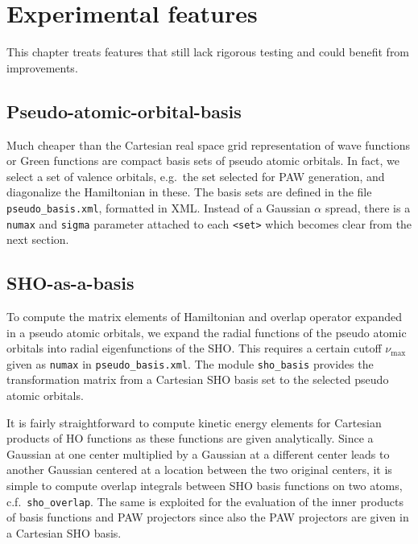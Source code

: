 \documentclass[oribibl]{llncs}
\newcommand{\um}[1]{_{\mathrm{#1}}}
\newcommand{\ttt}[1]{\texttt{#1}}
\begin{document}

\newpage
%

\section{Experimental features}
This chapter treats features that still lack rigorous testing and could benefit from improvements.

\subsection{Pseudo-atomic-orbital-basis}
Much cheaper than the Cartesian real space grid representation of wave functions or Green functions
are compact basis sets of pseudo atomic orbitals.
In fact, we select a set of valence orbitals, e.g.~the set selected for \ac{PAW} generation,
and diagonalize the Hamiltonian in these.
The basis sets are defined in the file \ttt{pseudo\_basis.xml}, formatted in \ac{XML}.
Instead of a Gaussian $\alpha$ spread, there is a \ttt{numax} and \ttt{sigma} parameter attached to each \ttt{<set>} which becomes clear from the next section.

\subsection{SHO-as-a-basis} \label{sec:sho-hamiltonian}
To compute the matrix elements of Hamiltonian and overlap operator expanded in a pseudo atomic orbitals,
we expand the radial functions of the pseudo atomic orbitals into radial eigenfunctions of the \ac{SHO}.
This requires a certain cutoff $\nu\um{max}$ given as \ttt{numax} in \ttt{pseudo\_basis.xml}.
The module \ttt{sho\_basis} provides the transformation matrix from a Cartesian \ac{SHO} basis set
to the selected pseudo atomic orbitals. 

It is fairly straightforward to compute kinetic energy elements for Cartesian products of \ac{HO} functions
as these functions are given analytically.
Since a Gaussian at one center multiplied by a Gaussian at a different center leads to another Gaussian
centered at a location between the two original centers, it is simple to compute overlap integrals between \ac{SHO} basis
functions on two atoms, c.f.~\ttt{sho\_overlap}.
The same is exploited for the evaluation of the inner products of basis functions and \ac{PAW} projectors
since also the \ac{PAW} projectors are given in a Cartesian \ac{SHO} basis.
\end{document}
